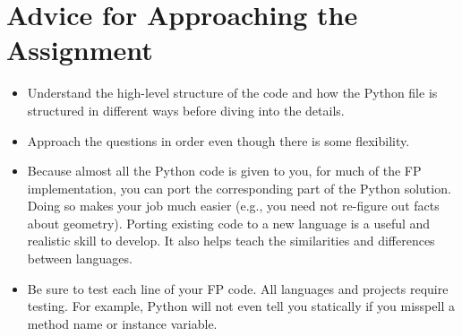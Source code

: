\documentclass[a4paper,12pt]{article}
\begin{document}
\section*{Advice for Approaching the Assignment}
\begin{itemize}
  \item Understand the high-level structure of the code and how the Python file is structured in different ways before diving into the details.
  \item Approach the questions in order even though there is some flexibility.
  \item Because almost all the Python code is given to you, for much of the FP implementation, you can port the corresponding part of the Python solution. Doing so makes your job much easier (e.g., you need not re-figure out facts about geometry). Porting existing code to a new language is a useful and realistic skill to develop. It also helps teach the similarities and differences between languages.
  \item Be sure to test each line of your FP code. All languages and projects require testing. For example, Python will not even tell you statically if you misspell a method name or instance variable.
\end{itemize}
\end{document}
